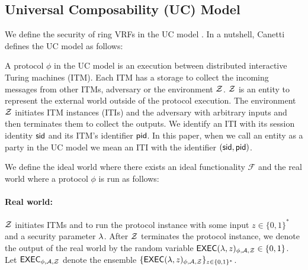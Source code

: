 %



\subsection{Universal Composability (UC) Model}
\label{subsec:uc_background}
We define the security of ring VRFs in the UC model \cite{canetti1,canetti2}. In a nutshell, Canetti \cite{canetti1,canetti2} defines the UC model as follows:

A protocol $ \phi $ in the UC model is an execution between distributed interactive Turing machines (ITM). Each ITM has a storage to collect the incoming messages from other ITMs, adversary \adv or the environment $ \mathcal{Z} $. $ \mathcal{Z} $ is an entity to represent the external world outside of the protocol execution.  The environment $ \mathcal{Z} $ initiates ITM instances (ITIs) and the adversary \adv with arbitrary inputs and then terminates them to collect the outputs.
We identify an ITI with its session identity $ \textsf{sid} $ and its ITM's identifier $ \textsf{pid} $. In this paper, when we call an entity as a party in the UC model we mean an ITI with the identifier $ (\textsf{sid}, \textsf{pid}) $.

We define the ideal world where there exists an ideal functionality $ \mathcal{F} $ and the real world where a protocol $ \phi $ is run as follows:

\paragraph{Real world:} $ \mathcal{Z} $ initiates ITMs and \adv to run the protocol instance with some input $ z \in \{0,1\}^* $  and a security parameter $ \lambda $. After $ \mathcal{Z} $ terminates the protocol instance, we denote the output of the real world by the random variable $ \mathsf{EXEC}(\lambda, z)_{\phi, \mathcal{A}, \mathcal{Z}} \in \{0,1\} $. Let $ \mathsf{EXEC}_{\phi, \mathcal{A}, \mathcal{Z}} $ denote the ensemble $ \{\mathsf{EXEC}(\lambda, z)_{\phi, \mathcal{A}, \mathcal{Z}} \}_{z \in \{0,1\}^*} $.

